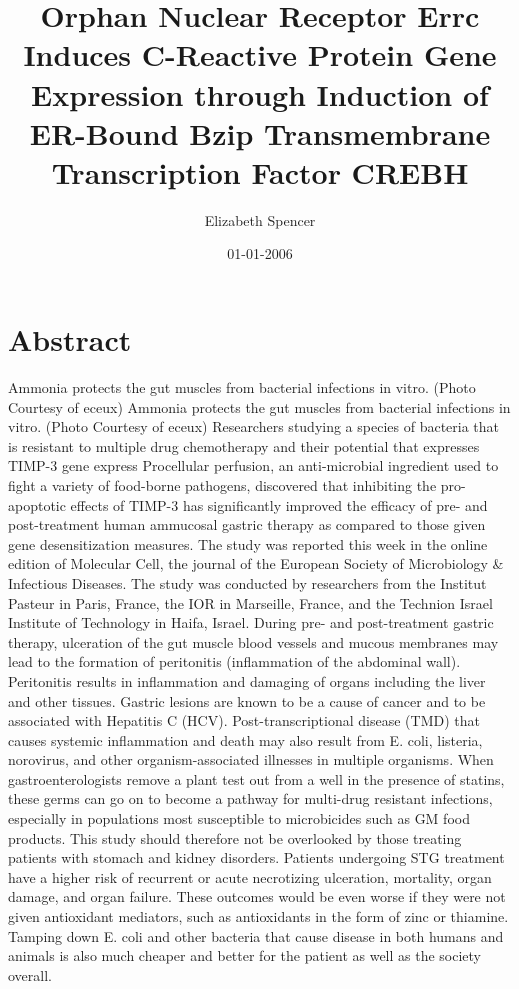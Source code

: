 \documentclass{article}%
\title{Orphan Nuclear Receptor Errc Induces C{-}Reactive Protein Gene Expression through Induction of ER{-}Bound Bzip Transmembrane Transcription Factor CREBH}%
\author{Elizabeth Spencer}%
\affil{School of Biosciences, University of Birmingham, Edgbaston, Birmingham B15 2TT, UK}%
\date{01{-}01{-}2006}%
\begin{document}
%
\normalsize%
\maketitle%
\section{Abstract}%
\label{sec:Abstract}%
Ammonia protects the gut muscles from bacterial infections in vitro. (Photo Courtesy of eceux) Ammonia protects the gut muscles from bacterial infections in vitro. (Photo Courtesy of eceux)\newline%
Researchers studying a species of bacteria that is resistant to multiple drug chemotherapy and their potential that expresses TIMP{-}3 gene express Procellular perfusion, an anti{-}microbial ingredient used to fight a variety of food{-}borne pathogens, discovered that inhibiting the pro{-}apoptotic effects of TIMP{-}3 has significantly improved the efficacy of pre{-} and post{-}treatment human ammucosal gastric therapy as compared to those given gene desensitization measures.\newline%
The study was reported this week in the online edition of Molecular Cell, the journal of the European Society of Microbiology \& Infectious Diseases. The study was conducted by researchers from the Institut Pasteur in Paris, France, the IOR in Marseille, France, and the Technion Israel Institute of Technology in Haifa, Israel.\newline%
During pre{-} and post{-}treatment gastric therapy, ulceration of the gut muscle blood vessels and mucous membranes may lead to the formation of peritonitis (inflammation of the abdominal wall). Peritonitis results in inflammation and damaging of organs including the liver and other tissues. Gastric lesions are known to be a cause of cancer and to be associated with Hepatitis C (HCV). Post{-}transcriptional disease (TMD) that causes systemic inflammation and death may also result from E. coli, listeria, norovirus, and other organism{-}associated illnesses in multiple organisms. When gastroenterologists remove a plant test out from a well in the presence of statins, these germs can go on to become a pathway for multi{-}drug resistant infections, especially in populations most susceptible to microbicides such as GM food products.\newline%
This study should therefore not be overlooked by those treating patients with stomach and kidney disorders. Patients undergoing STG treatment have a higher risk of recurrent or acute necrotizing ulceration, mortality, organ damage, and organ failure. These outcomes would be even worse if they were not given antioxidant mediators, such as antioxidants in the form of zinc or thiamine. Tamping down E. coli and other bacteria that cause disease in both humans and animals is also much cheaper and better for the patient as well as the society overall.\newline%
\end{document}
